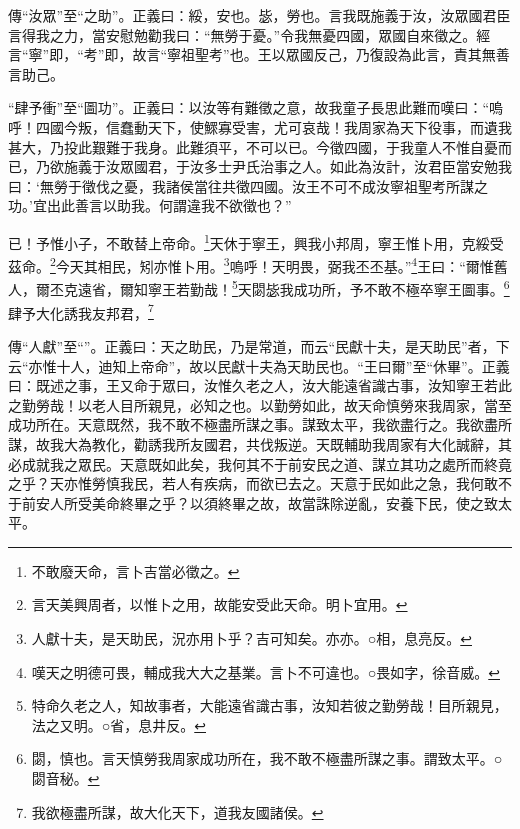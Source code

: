 {\noindent\zhuan{}\fzbyks 傳“汝眾”至“之助”。正義曰：綏，安也。毖，勞也。言我既施義于汝，汝眾國君臣言得我之力，當安慰勉勸我曰：“無勞于憂。”令我無憂四國，眾國自來徵之。經言“寧”即，“考”即，故言“寧祖聖考”也。王以眾國反己，乃復設為此言，責其無善言助己。 \par}

{\noindent\shu{}\fzkt “肆予衝”至“圖功”。正義曰：以汝等有難徵之意，故我童子長思此難而嘆曰：“嗚呼！四國今叛，信蠢動天下，使鰥寡受害，尤可哀哉！我周家為天下役事，而遺我甚大，乃投此艱難于我身。此難須平，不可以已。今徵四國，于我童人不惟自憂而已，乃欲施義于汝眾國君，于汝多士尹氏治事之人。如此為汝計，汝君臣當安勉我曰：‘無勞于徵伐之憂，我諸侯當往共徵四國。汝王不可不成汝寧祖聖考所謀之功。’宜出此善言以助我。何謂違我不欲徵也？” \par}

已！予惟小子，不敢替上帝命。\footnote{不敢廢天命，言卜吉當必徵之。}天休于寧王，興我小邦周，寧王惟卜用，克綏受茲命。\footnote{言天美興周者，以惟卜之用，故能安受此天命。明卜宜用。}今天其相民，矧亦惟卜用。\footnote{人獻十夫，是天助民，況亦用卜乎？吉可知矣。亦亦。○相，息亮反。}嗚呼！天明畏，弼我丕丕基。”\footnote{嘆天之明德可畏，輔成我大大之基業。言卜不可違也。○畏如字，徐音威。}王曰：“爾惟舊人，爾丕克遠省，爾知寧王若勤哉！\footnote{特命久老之人，知故事者，大能遠省識古事，汝知若彼之勤勞哉！目所親見，法之又明。○省，息井反。}天閟毖我成功所，予不敢不極卒寧王圖事。\footnote{閟，慎也。言天慎勞我周家成功所在，我不敢不極盡所謀之事。謂致太平。○閟音秘。}肆予大化誘我友邦君，\footnote{我欲極盡所謀，故大化天下，道我友國諸侯。}



{\noindent\zhuan{}\fzbyks 傳“人獻”至“”。正義曰：天之助民，乃是常道，而云“民獻十夫，是天助民”者，下云“亦惟十人，迪知上帝命”，故以民獻十夫為天助民也。“王曰爾”至“休畢”。正義曰：既述之事，王又命于眾曰，汝惟久老之人，汝大能遠省識古事，汝知寧王若此之勤勞哉！以老人目所親見，必知之也。以勤勞如此，故天命慎勞來我周家，當至成功所在。天意既然，我不敢不極盡所謀之事。謀致太平，我欲盡行之。我欲盡所謀，故我大為教化，勸誘我所友國君，共伐叛逆。天既輔助我周家有大化誠辭，其必成就我之眾民。天意既如此矣，我何其不于前安民之道、謀立其功之處所而終竟之乎？天亦惟勞慎我民，若人有疾病，而欲已去之。天意于民如此之急，我何敢不于前安人所受美命終畢之乎？以須終畢之故，故當誅除逆亂，安養下民，使之致太平。 \par}

